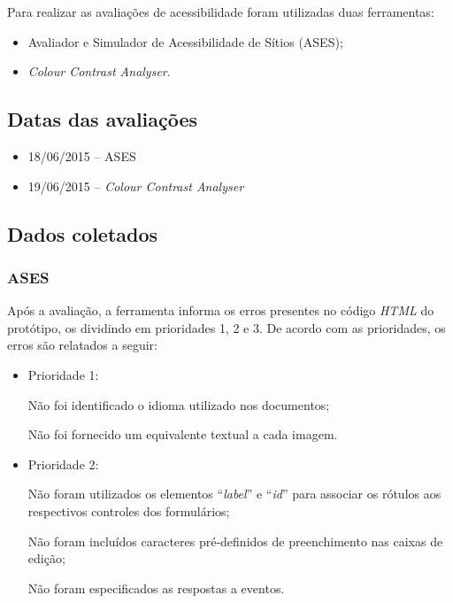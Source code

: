     Para realizar as avaliações de acessibilidade foram utilizadas duas ferramentas:

    \begin{itemize}
	\item Avaliador e Simulador de Acessibilidade de Sítios (ASES);
	\item \textit{Colour Contrast Analyser}.
    \end{itemize}
     
    \subsection{Datas das avaliações}

    \begin{itemize}
	\item 18/06/2015 – ASES
	\item 19/06/2015 – \textit{Colour Contrast Analyser}
    \end{itemize}
               
    \subsection{Dados coletados}
    
    \subsubsection{ASES}
        
    Após a avaliação, a ferramenta informa os erros presentes no código \textit{HTML} do
    protótipo, os dividindo em prioridades 1, 2 e 3. De acordo com as prioridades, os erros são 
    relatados a seguir:    
    
    \begin{itemize}
    \item Prioridade 1:
    
    Não foi identificado o idioma utilizado nos documentos;

    Não foi fornecido um equivalente textual a cada imagem.
    \item Prioridade 2:   
    
    Não foram utilizados os elementos “\textit{label}” e “\textit{id}” para associar os rótulos aos 
    respectivos controles dos formulários;

    Não foram incluídos caracteres pré-definidos de preenchimento nas caixas de edição;

    Não foram especificados as respostas a eventos.
    \end{itemize}
    
